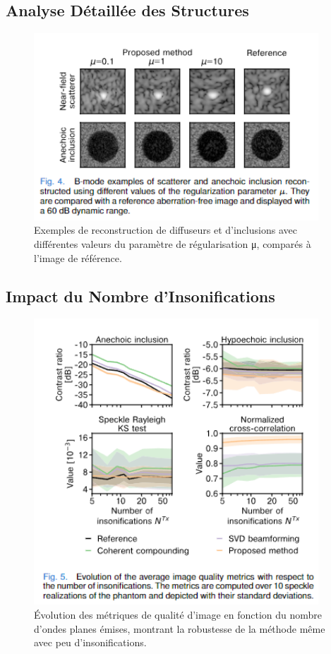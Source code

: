 \documentclass[12pt,a4paper]{article}
\begin{document}
\subsection{Analyse Détaillée des Structures}
\begin{figure}[H]
    \centering
    \includegraphics[width=0.95\textwidth]{paper/fig_4.png}
    \caption{Exemples de reconstruction de diffuseurs et d'inclusions avec différentes valeurs du paramètre de régularisation μ, comparés à l'image de référence.}
\end{figure}

\subsection{Impact du Nombre d'Insonifications}
\begin{figure}[H]
    \centering
    \includegraphics[width=0.95\textwidth]{paper/fig_5.png}
    \caption{Évolution des métriques de qualité d'image en fonction du nombre d'ondes planes émises, montrant la robustesse de la méthode même avec peu d'insonifications.}
\end{figure}
\end{document}
